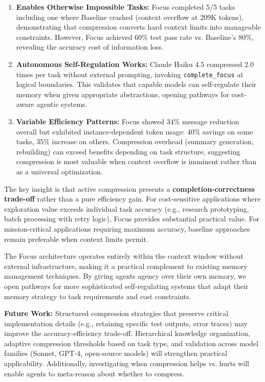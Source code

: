\documentclass[conference]{IEEEtran}
\begin{document}
\begin{enumerate}
    \item \textbf{Enables Otherwise Impossible Tasks:} Focus completed 5/5 tasks including one where Baseline crashed (context overflow at 209K tokens), demonstrating that compression converts hard context limits into manageable constraints. However, Focus achieved 60\% test pass rate vs. Baseline's 80\%, revealing the accuracy cost of information loss.
    
    \item \textbf{Autonomous Self-Regulation Works:} Claude Haiku 4.5 compressed 2.0 times per task without external prompting, invoking \texttt{complete\_focus} at logical boundaries. This validates that capable models can self-regulate their memory when given appropriate abstractions, opening pathways for cost-aware agentic systems.
    
    \item \textbf{Variable Efficiency Patterns:} Focus showed 34\% message reduction overall but exhibited instance-dependent token usage: 40\% savings on some tasks, 35\% increase on others. Compression overhead (summary generation, rebuilding) can exceed benefits depending on task structure, suggesting compression is most valuable when context overflow is imminent rather than as a universal optimization.
\end{enumerate}

The key insight is that active compression presents a \textbf{completion-correctness trade-off} rather than a pure efficiency gain. For cost-sensitive applications where exploration value exceeds individual task accuracy (e.g., research prototyping, batch processing with retry logic), Focus provides substantial practical value. For mission-critical applications requiring maximum accuracy, baseline approaches remain preferable when context limits permit.

The Focus architecture operates entirely within the context window without external infrastructure, making it a practical complement to existing memory management techniques. By giving agents agency over their own memory, we open pathways for more sophisticated self-regulating systems that adapt their memory strategy to task requirements and cost constraints.

\textbf{Future Work:} Structured compression strategies that preserve critical implementation details (e.g., retaining specific test outputs, error traces) may improve the accuracy-efficiency trade-off. Hierarchical knowledge organization, adaptive compression thresholds based on task type, and validation across model families (Sonnet, GPT-4, open-source models) will strengthen practical applicability. Additionally, investigating when compression helps vs. hurts will enable agents to meta-reason about whether to compress.
\end{document}
